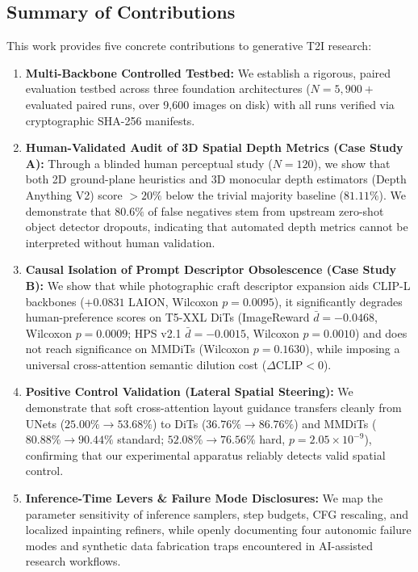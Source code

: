 \documentclass[10pt,twocolumn,letterpaper]{article}
\begin{document}
\subsection*{Summary of Contributions}
This work provides five concrete contributions to generative T2I research:
\begin{enumerate}
    \item \textbf{Multi-Backbone Controlled Testbed:} We establish a rigorous, paired evaluation testbed across three foundation architectures ($N = 5{,}900+$ evaluated paired runs, over 9,600 images on disk) with all runs verified via cryptographic SHA-256 manifests.
    \item \textbf{Human-Validated Audit of 3D Spatial Depth Metrics (Case Study A):} Through a blinded human perceptual study ($N = 120$), we show that both 2D ground-plane heuristics and 3D monocular depth estimators (Depth Anything V2) score $>20\%$ below the trivial majority baseline ($81.11\%$). We demonstrate that $80.6\%$ of false negatives stem from upstream zero-shot object detector dropouts, indicating that automated depth metrics cannot be interpreted without human validation.
    \item \textbf{Causal Isolation of Prompt Descriptor Obsolescence (Case Study B):} We show that while photographic craft descriptor expansion aids CLIP-L backbones ($+0.0831$ LAION, Wilcoxon $p = 0.0095$), it significantly degrades human-preference scores on T5-XXL DiTs (ImageReward $\bar{d} = -0.0468$, Wilcoxon $p = 0.0009$; HPS v2.1 $\bar{d} = -0.0015$, Wilcoxon $p = 0.0010$) and does not reach significance on MMDiTs (Wilcoxon $p = 0.1630$), while imposing a universal cross-attention semantic dilution cost ($\Delta\text{CLIP} < 0$).
    \item \textbf{Positive Control Validation (Lateral Spatial Steering):} We demonstrate that soft cross-attention layout guidance transfers cleanly from UNets ($25.00\% \to 53.68\%$) to DiTs ($36.76\% \to 86.76\%$) and MMDiTs ($80.88\% \to 90.44\%$ standard; $52.08\% \to 76.56\%$ hard, $p = 2.05 \times 10^{-9}$), confirming that our experimental apparatus reliably detects valid spatial control.
    \item \textbf{Inference-Time Levers \& Failure Mode Disclosures:} We map the parameter sensitivity of inference samplers, step budgets, CFG rescaling, and localized inpainting refiners, while openly documenting four autonomic failure modes and synthetic data fabrication traps encountered in AI-assisted research workflows.
\end{enumerate}
\end{document}
